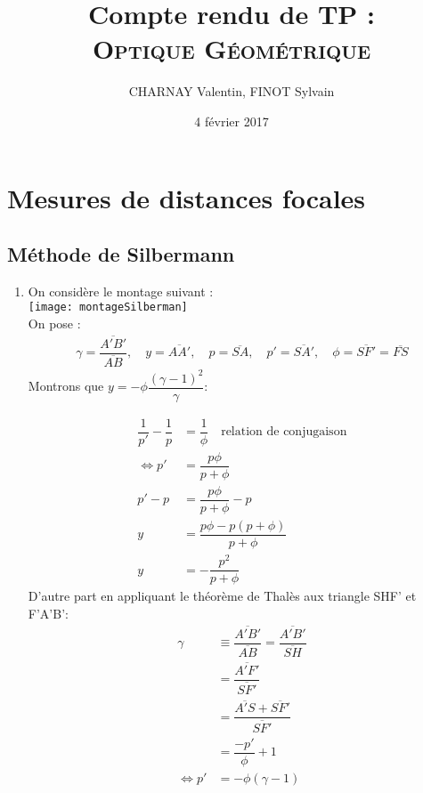 \documentclass[12pt,a4paper]{article}
\author{CHARNAY Valentin, FINOT Sylvain}
\title{Compte rendu de TP :\\ \scshape Optique Géométrique}
\date{4 février 2017}
\begin{document}
\maketitle
\section{Mesures de distances focales}
\subsection{Méthode de Silbermann}
\begin{enumerate}
	\item 
On considère le montage suivant :\\
\texttt{[image: montageSilberman]}\\
On pose : 
$$
\begin{aligned}
\gamma = \dfrac{\overline{A'B'}}{\overline{AB}} ,\quad y=\overline{AA'},\quad p=\overline{SA},\quad p'=\overline{SA'},\quad \phi=\overline{SF'}=\overline{FS}
\end{aligned}
$$
Montrons que $y=-\phi\dfrac{{(\gamma-1)}^2}{\gamma}$:
\begin{multicols}{2}
	\begingroup
	\addtolength{\jot}{1em}
	\noindent
	\begin{align*}
	\dfrac{1}{p'}-\dfrac{1}{p}&=\dfrac{1}{\phi}\quad \text{relation de conjugaison}\\
\iff	p'&=\dfrac{p\phi}{p+\phi}\\
	p'-p &= \dfrac{p\phi}{p+\phi}-p\\
	y &= \dfrac{p\phi-p(p+\phi)}{p+\phi}\\
	y&=-\dfrac{p^2}{p+\phi}
	\end{align*}
	\endgroup
	\setlength\columnseprule{0.4pt}
	\vfill
	\columnbreak
	D'autre part en appliquant le théorème de Thalès aux triangle SHF' et F'A'B':
	\begingroup
	\addtolength{\jot}{1em}
	\noindent
	\begin{align*}
	\gamma&\equiv\dfrac{\overline{A'B'}}{\overline{AB}} = \dfrac{\overline{A'B'}}{\overline{SH}}\\
	&=\dfrac{\overline{A'F'}}{\overline{SF'}}\\
	&=\dfrac{\overline{A'S}+\overline{SF'}}{\overline{SF'}}\\
	&=\dfrac{-p'}{\phi}+1\\
	\iff p' &= -\phi(\gamma-1)
	\end{align*}
	\endgroup
\end{multicols}
\vspace*{+1em}

\end{enumerate}
\end{document}
